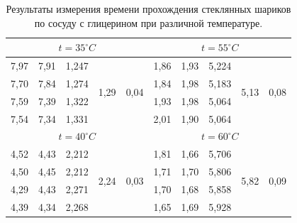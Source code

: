 \documentclass[12pt,a4paper]{article}
\begin{document}
\begin{table}[h]
\begin{tabular}{|c|c|c|c|c||c|c|c|c|c|}
\multicolumn{5}{|c|}{$t = 35^\circ C $}                                              & \multicolumn{5}{c|}{$t = 55^\circ C $}                                             \\ \hline
7,97  & 7,91  & 1,247 & \multirow{4}{*}{1,29} & \multirow{4}{*}{0,04} & 1,86 & 1,93 & 5,224 & \multirow{4}{*}{5,13} & \multirow{4}{*}{0,08} \\ \cline{1-3} \cline{6-8}
7,70  & 7,84  & 1,274 &                       &                       & 1,84 & 1,98 & 5,183 &                       &                       \\ \cline{1-3} \cline{6-8}
7,59  & 7,39  & 1,322 &                       &                       & 1,93 & 1,98 & 5,064 &                       &                       \\ \cline{1-3} \cline{6-8}
7,54  & 7,34  & 1,331 &                       &                       & 2,01 & 1,90 & 5,064 &                       &                       \\ \hline
\multicolumn{5}{|c|}{$t = 40^\circ  C$}                                              & \multicolumn{5}{c|}{$t = 60^\circ C $}                                             \\ \hline
4,52  & 4,43  & 2,212 & \multirow{4}{*}{2,24} & \multirow{4}{*}{0,03} & 1,81 & 1,66 & 5,706 & \multirow{4}{*}{5,82} & \multirow{4}{*}{0,09} \\ \cline{1-3} \cline{6-8}
4,50  & 4,45  & 2,212 &                       &                       & 1,71 & 1,70 & 5,806 &                       &                       \\ \cline{1-3} \cline{6-8}
4,29  & 4,43  & 2,271 &                       &                       & 1,70 & 1,68 & 5,858 &                       &                       \\ \cline{1-3} \cline{6-8}
4,39  & 4,34  & 2,268 &                       &                       & 1,65 & 1,69 & 5,928 &                       &                       \\ \hline
\end{tabular}
\caption{Результаты измерения времени прохождения стеклянных шариков по сосуду с глицерином при различной температуре.}
\label{tab:glass_balls_measuring}
\end{table}
\end{document}
